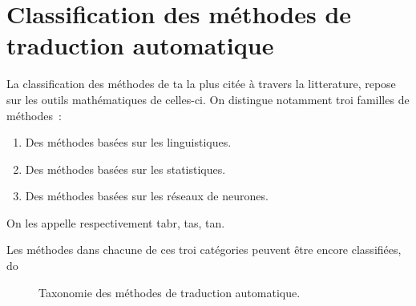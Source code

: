 \section{Classification des méthodes de traduction automatique}

La classification des méthodes de \acrshort{ta} la plus citée à travers la litterature, 
repose sur les outils mathématiques de celles-ci.
On distingue notamment troi familles de méthodes~\cite{deep-nmt-survey}:
\begin{enumerate}
    \item Des méthodes basées sur les linguistiques.
    \item Des méthodes basées sur les statistiques.
    \item Des méthodes basées sur les réseaux de neurones.
\end{enumerate}

On les appelle respectivement \Acrfull{tabr}, \Acrfull{tas}, \Acrfull{tan}.

Les méthodes dans chacune de ces troi catégories peuvent être encore classifiées,
do

\begin{figure}
    \begin{center}
       \resizebox{\textwidth}{!}{
         
       }
    \end{center}
    \caption{Taxonomie des méthodes de traduction automatique.}
    \label{fig:mat-taxonomy-tree}
\end{figure}
